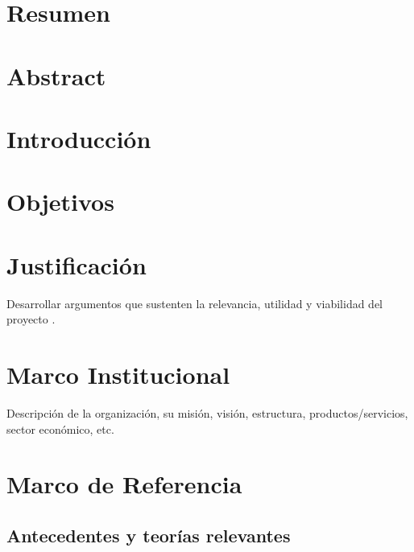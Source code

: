 \documentclass[12pt]{article}
\newcommand{\chapterbreak}{\clearpage \thispagestyle{fancy}}
\begin{document}
\chapterbreak
\section*{Resumen}


\chapterbreak
\section*{Abstract}


\chapterbreak
\tableofcontents
\newpage

\listoffigures
\listoftables

\chapterbreak
\section{Introducción}


\chapterbreak
\section{Objetivos}


\chapterbreak
\section{Justificaci\'on}
Desarrollar argumentos que sustenten la relevancia, utilidad y viabilidad del proyecto \parencite{hawking2010}.

\chapterbreak

\section{Marco Institucional}
Descripci\'on de la organizaci\'on, su misi\'on, visi\'on, estructura, productos/servicios, sector econ\'omico, etc.

\chapterbreak

\section{Marco de Referencia}
\subsection*{Antecedentes y teor\'ias relevantes}
\end{document}
